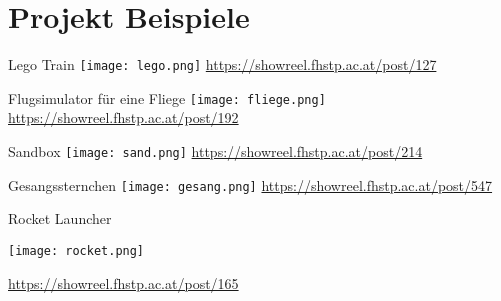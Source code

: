 \section{Projekt Beispiele}
 \frame{\sectionpage}

\begin{frame}{Lego Train}
\texttt{[image: lego.png]}
\url{https://showreel.fhstp.ac.at/post/127}
\end{frame}


\begin{frame}{Flugsimulator für eine Fliege}
\texttt{[image: fliege.png]}
\url{https://showreel.fhstp.ac.at/post/192}
\end{frame}

\begin{frame}{Sandbox}
\texttt{[image: sand.png]}
\url{https://showreel.fhstp.ac.at/post/214}
\end{frame}


\begin{frame}{Gesangssternchen}
\texttt{[image: gesang.png]}
\url{https://showreel.fhstp.ac.at/post/547}
\end{frame}

\begin{frame}{Rocket Launcher}

\texttt{[image: rocket.png]}

\url{https://showreel.fhstp.ac.at/post/165}
\end{frame}


